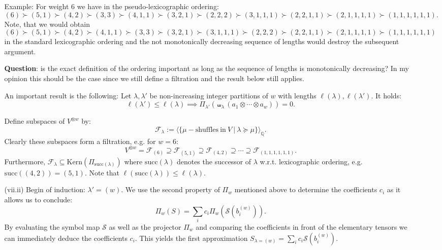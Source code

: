 \documentclass[10pt]{article}
\newcommand*{\Kern}{\mathrm{Kern}}
\newcommand*{\IQ}{\mathbb{Q}}
\newcommand*{\sff}{\mathcal{S}}
\newcommand*{\fff}{\mathcal{F}}
\newcommand*{\suc}{\mathrm{succ}}
\begin{document}
\begin{itemize}
\begin{itemize}
Example: For weight $6$ we have in the pseudo-lexicographic ordering:
\begin{equation*}
(6) \succ (5,1) \succ (4,2) \succ (3,3) \succ (4,1,1)  \succ (3, 2, 1) \succ (2,2,2) \succ (3,1,1,1) \succ (2,2,1,1) \succ (2,1,1,1,1) \succ (1,1,1,1,1,1).
\end{equation*}
Note, that we would obtain
\begin{equation*}
(6) \succ (5,1) \succ (4,2)  \succ (4,1,1) \succ (3,3) \succ (3, 2, 1) \succ (3,1,1,1) \succ (2,2,2) \succ (2,2,1,1) \succ (2,1,1,1,1) \succ (1,1,1,1,1,1)
\end{equation*}
in the standard lexicographic ordering and the not monotonically decreasing sequence of lengths would destroy the subsequent argument.

\textbf{Question}: is the exact definition of the ordering important as long as the sequence of lengths is monotonically decreasing? In my opinion this should be the case since we still define a filtration and the result below still applies.

An important result is the following: Let $\lambda, \lambda'$ be non-increasing integer partitions of $w$ with lengths $\ell(\lambda), \ell(\lambda')$. It holds:
\begin{equation*}
\ell(\lambda') \leq \ell(\lambda) \implies \Pi_{\lambda'} (\shuffle_{\lambda}(a_1 \otimes \cdots \otimes a_w)) = 0.
\end{equation*}

Define subspaces of $V^{\otimes w}$ by:
\begin{equation*}
\fff_{\lambda} := \langle \{ \mu-\mathrm{shuffles \ in \ } V \ | \ \lambda \succeq \mu \}\rangle_{\IQ}.
\end{equation*}
Clearly these subspaces form a filtration, e.g. for $w = 6$:
\begin{equation*}
V^{\otimes w} = \fff_{(6)} \supseteq \fff_{(5,1)} \supseteq \fff_{(4,2)} \supseteq \cdots \supseteq \fff_{(1, 1, 1, 1, 1, 1)}.
\end{equation*}
Furthermore, $\fff_{\lambda} \subseteq \Kern(\Pi_{\suc(\lambda)})$ where $\suc(\lambda)$ denotes the successor of $\lambda$ w.r.t. lexicographic ordering, e.g. $\suc((4,2)) = (5,1)$. Note that $\ell(\suc(\lambda)) \leq \ell(\lambda)$.

\item[(vii.ii)] Begin of induction: $\lambda' = (w)$. We use the second property of $\Pi_w$ mentioned above to determine the coefficients $c_i$ as it allows us to conclude:
\begin{equation*}
\Pi_w(S) = \sum_i c_i \Pi_w(\sff(b_i^{(w)})).
\end{equation*}
By evaluating the symbol map $\sff$ as well as the projector $\Pi_w$ and comparing the coefficients in front of the elementary tensors we can immediately deduce the coefficients $c_i$. This yields the first approximation $S_{\lambda = (w)} = \sum_{i} c_i \sff (b_i^{(w)})$.


\end{itemize}
\end{itemize}
\end{document}
